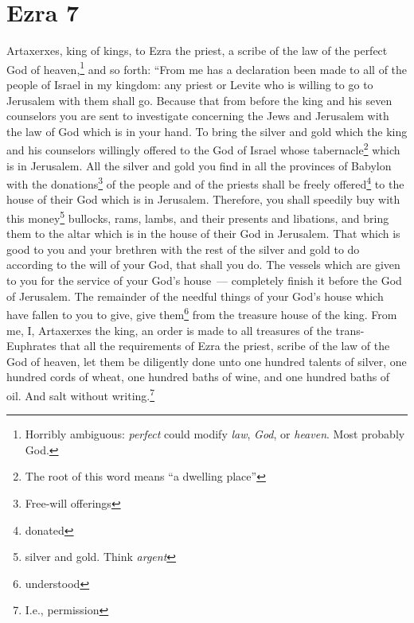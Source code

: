 \section{Ezra 7}\label{Ezra 7}
\begin{enumerate}[align=center]
     Artaxerxes, king of kings, to Ezra the priest, a scribe of the law of the perfect God of heaven,\footnote{Horribly ambiguous: \emph{perfect} could modify \emph{law}, \emph{God}, or \emph{heaven}. Most probably God.} and so forth:%
     ``From me has a declaration been made to all of the people of Israel in my kingdom: any priest or Levite who is willing to go to Jerusalem with them shall go.%
     Because that from before the king and his seven counselors you are sent to investigate concerning the Jews and Jerusalem with the law of God which is in your hand.%
     To bring the silver and gold which the king and his counselors willingly offered to the God of Israel whose tabernacle\footnote{The root of this word means ``a dwelling place''} which is in Jerusalem.%
     All the silver and gold you find in all the provinces of Babylon with the donations\footnote{Free-will offerings} of the people and of the priests shall be freely offered\footnote{donated} to the house of their God which is in Jerusalem.%
     Therefore, you shall speedily buy with this money\footnote{silver and gold. Think \emph{argent}} bullocks, rams, lambs, and their presents and libations, and bring them to the altar which is in the house of their God in Jerusalem.%
     That which is good to you and your brethren with the rest of the silver and gold to do according to the will of your God, that shall you do.%
     The vessels which are given to you for the service of your God's house~--- completely finish it before the God of Jerusalem.%
     The remainder of the needful things of your God's house which have fallen to you to give, give them\footnote{understood} from the treasure house of the king.%
     From me, I, Artaxerxes the king, an order is made to all treasures of the trans-Euphrates that all the requirements of Ezra the priest, scribe of the law of the God of heaven, let them be diligently done%
     unto one hundred talents of silver, one hundred cords of wheat, one hundred baths of wine, and one hundred baths of oil. And salt without writing.\footnote{I.e., permission}%

\end{enumerate}
